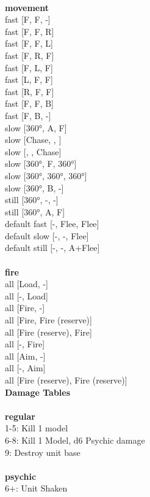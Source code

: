 \ \\ {\bf movement } \\
fast [F, F, -] \\
fast [F, F, R] \\
fast [F, F, L] \\
fast [F, R, F] \\
fast [F, L, F] \\
fast [L, F, F] \\
fast [R, F, F] \\
fast [F, F, B] \\
fast [F, B, -] \\
slow [360°, A, F] \\
slow [Chase, , ] \\
slow [, , Chase] \\
slow [360°, F, 360°] \\
slow [360°, 360°, 360°] \\
slow [360°, B, -] \\
still [360°, -, -] \\
still [360°, A, F] \\
default fast [-, Flee, Flee] \\
default slow [-, -, Flee] \\
default still [-, -, A+Flee] \\
\ \\ {\bf fire } \\
all [Load, -] \\
all [-, Load] \\
all [Fire, -] \\
all [Fire, Fire (reserve)] \\
all [Fire (reserve), Fire] \\
all [-, Fire] \\
all [Aim, -] \\
all [-, Aim] \\
all [Fire (reserve), Fire (reserve)] \\


{\bf Damage Tables} \\
\ \\ {\bf regular } \\
1-5: Kill 1 model \\
6-8: Kill 1 Model, d6 Psychic damage \\
9: Destroy unit base \\
\ \\ {\bf psychic } \\
6+: Unit Shaken \\










